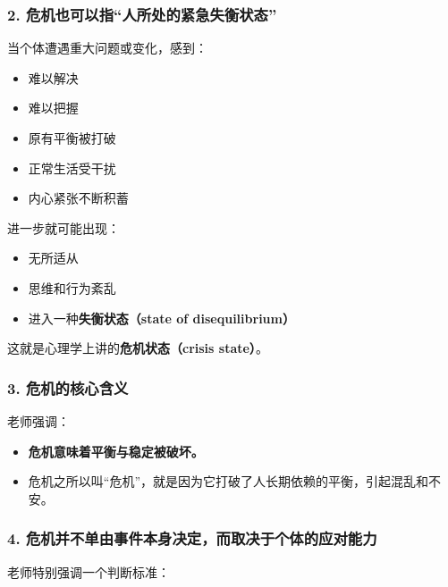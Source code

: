 \documentclass[
  chinese,
  9pt,
  a4paper,
]{ctexart}
\providecommand{\tightlist}{%
  \setlength{\itemsep}{0pt}\setlength{\parskip}{0pt}}
\begin{document}
\subsubsection{2.
危机也可以指``人所处的紧急失衡状态''}\label{ux5371ux673aux4e5fux53efux4ee5ux6307ux4ebaux6240ux5904ux7684ux7d27ux6025ux5931ux8861ux72b6ux6001}

当个体遭遇重大问题或变化，感到：

\begin{itemize}
\tightlist
\item
  难以解决
\item
  难以把握
\item
  原有平衡被打破
\item
  正常生活受干扰
\item
  内心紧张不断积蓄
\end{itemize}

进一步就可能出现：

\begin{itemize}
\tightlist
\item
  无所适从
\item
  思维和行为紊乱
\item
  进入一种\textbf{失衡状态（state of disequilibrium）}
\end{itemize}

这就是心理学上讲的\textbf{危机状态（crisis state）}。

\subsubsection{3.
危机的核心含义}\label{ux5371ux673aux7684ux6838ux5fc3ux542bux4e49}

老师强调：

\begin{itemize}
\tightlist
\item
  \textbf{危机意味着平衡与稳定被破坏。}
\item
  危机之所以叫``危机''，就是因为它打破了人长期依赖的平衡，引起混乱和不安。
\end{itemize}

\subsubsection{4.
危机并不单由事件本身决定，而取决于个体的应对能力}\label{ux5371ux673aux5e76ux4e0dux5355ux7531ux4e8bux4ef6ux672cux8eabux51b3ux5b9aux800cux53d6ux51b3ux4e8eux4e2aux4f53ux7684ux5e94ux5bf9ux80fdux529b}

老师特别强调一个判断标准：
\end{document}
